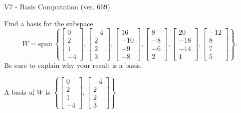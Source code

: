 \begin{exercise}
  \begin{exerciseTitle}V7 - Basis Computation (ver. 669)\end{exerciseTitle}
  \begin{exerciseStatement}
    Find a basis for the subspace 
\[W=\mathrm{span}\ \left\{\left[\begin{array}{r}
0 \\
2 \\
1 \\
-4
\end{array}\right] , \left[\begin{array}{r}
-4 \\
2 \\
2 \\
3
\end{array}\right] , \left[\begin{array}{r}
16 \\
-10 \\
-9 \\
-8
\end{array}\right] , \left[\begin{array}{r}
8 \\
-8 \\
-6 \\
2
\end{array}\right] , \left[\begin{array}{r}
20 \\
-18 \\
-14 \\
1
\end{array}\right] , \left[\begin{array}{r}
-12 \\
8 \\
7 \\
5
\end{array}\right]\right\}.\]
 Be sure to explain why your result is a basis.


  \end{exerciseStatement}
  \begin{exerciseAnswer}
   A basis of \(W\) is  \(\left\{\left[\begin{array}{r}
0 \\
2 \\
1 \\
-4
\end{array}\right] , \left[\begin{array}{r}
-4 \\
2 \\
2 \\
3
\end{array}\right]\right\}\).
  


  \end{exerciseAnswer}
\end{exercise}